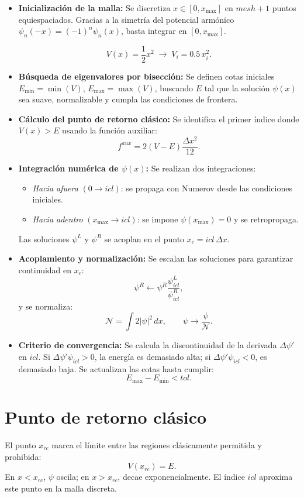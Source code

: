 \documentclass[11pt]{article}
\begin{document}
\begin{itemize}
\item \textbf{Inicialización de la malla:}  
  Se discretiza \(x\in[0,x_{\text{max}}]\) en \(mesh+1\) puntos equiespaciados.  
  Gracias a la simetría del potencial armónico \(\psi_n(-x)=(-1)^n\psi_n(x)\), 
  basta integrar en \([0,x_{\text{max}}]\).

  \[
  V(x)=\frac{1}{2}x^2 \;\to\; V_i=0.5\,x_i^2.
  \]

\item \textbf{Búsqueda de eigenvalores por bisección:}  
  Se definen cotas iniciales \(E_{\text{min}}=\min(V)\), \(E_{\text{max}}=\max(V)\), 
  buscando \(E\) tal que la solución \(\psi(x)\) sea suave, normalizable y cumpla las condiciones de frontera.

\item \textbf{Cálculo del punto de retorno clásico:}  
  Se identifica el primer índice donde \(V(x)>E\) usando la función auxiliar:
  \[
  f^{aux}=2(V-E)\frac{\Delta x^2}{12}.
  \]

\item \textbf{Integración numérica de \(\psi(x)\):}  
  Se realizan dos integraciones:
  \begin{itemize}
  \item \emph{Hacia afuera} \((0\to icl)\): se propaga con Numerov desde las condiciones iniciales.
  \item \emph{Hacia adentro} \((x_{\text{max}}\to icl)\): se impone \(\psi(x_{\text{max}})=0\)
  y se retropropaga.
  \end{itemize}
  Las soluciones \(\psi^L\) y \(\psi^R\) se acoplan en el punto \(x_c=icl\,\Delta x\).

\item \textbf{Acoplamiento y normalización:}  
  Se escalan las soluciones para garantizar continuidad en \(x_c\):
  \[
  \psi^R \leftarrow \psi^R \frac{\psi^L_{icl}}{\psi^R_{icl}},
  \]
  y se normaliza:
  \[
  \mathcal{N}=\int 2|\psi|^2\,dx, \qquad \psi\to \frac{\psi}{\mathcal{N}}.
  \]

\item \textbf{Criterio de convergencia:}  
  Se calcula la discontinuidad de la derivada \(\Delta\psi'\) en \(icl\).  
  Si \(\Delta\psi'\psi_{icl}>0\), la energía es demasiado alta;  
  si \(\Delta\psi'\psi_{icl}<0\), es demasiado baja.  
  Se actualizan las cotas hasta cumplir:
  \[
  E_{\text{max}}-E_{\text{min}}<tol.
  \]
\end{itemize}

\section{Punto de retorno clásico}
El punto \(x_{rc}\) marca el límite entre las regiones clásicamente permitida y prohibida:
\[
V(x_{rc})=E.
\]
En \(x<x_{rc}\), \(\psi\) oscila; en \(x>x_{rc}\), decae exponencialmente.
El índice \(icl\) aproxima este punto en la malla discreta.
\end{document}
